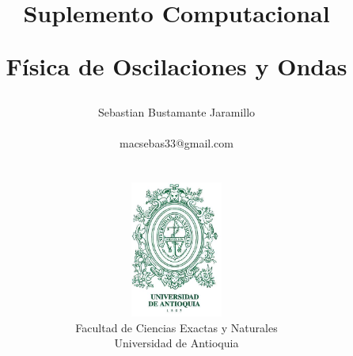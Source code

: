 \documentclass[12pt]{book}
\begin{document}
\title{Suplemento Computacional \\
\begin{Huge}
\textbf{Física de Oscilaciones y Ondas}
\end{Huge}}
\author{ Sebastian Bustamante Jaramillo\\ \begin{small}
macsebas33@gmail.com
\end{small} \\ \vspace{5cm} \\
\includegraphics[width=3cm]{pictures/UdeA_Shield} \\
Facultad de Ciencias Exactas y Naturales \\ 
Universidad de Antioquia }
\date{}
\maketitle



\newpage{\pagestyle{empty}\cleardoublepage}  

\tableofcontents
\newpage{\pagestyle{empty}\cleardoublepage}  









\end{document}
